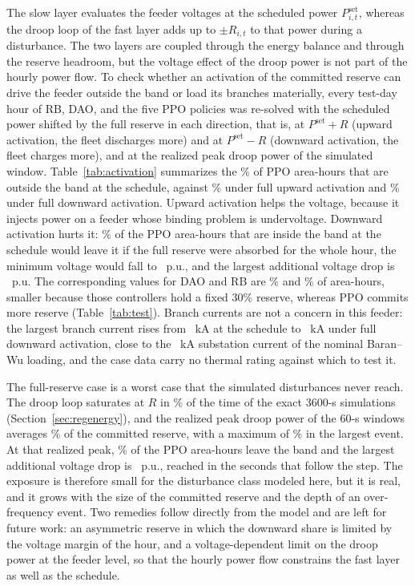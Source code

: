 The slow layer evaluates the feeder voltages at the scheduled power
$P^{\mathrm{set}}_{i,t}$, whereas the droop loop of the fast layer
adds up to $\pm R_{i,t}$ to that power during a disturbance. The two
layers are coupled through the energy balance and through the reserve
headroom, but the voltage effect of the droop power is not part of
the hourly power flow. To check whether an activation of the
committed reserve can drive the feeder outside the band or load its
branches materially, every test-day hour of RB, DAO, and the five PPO
policies was re-solved with the scheduled power shifted by the full
reserve in each direction, that is, at $P^{\mathrm{set}}+R$ (upward
activation, the fleet discharges more) and at $P^{\mathrm{set}}-R$
(downward activation, the fleet charges more), and at the realized
peak droop power of the simulated window. Table~\ref{tab:activation}
summarizes the \ActPPOViolFracSched\% of PPO area-hours that are outside the
band at the schedule, against \ActPPOViolFracUp\% under full upward
activation and \ActPPOViolFracDown\% under full downward activation.
Upward activation helps the voltage, because it injects power on a
feeder whose binding problem is undervoltage. Downward activation
hurts it: \ActPPONewViolFracDown\% of the PPO area-hours that are
inside the band at the schedule would leave it if the full reserve
were absorbed for the whole hour, the minimum voltage would fall to
\ActPPOVminDown~p.u., and the largest additional voltage drop is
\ActPPODvminDownMax~p.u. The corresponding values for DAO and RB are
\ActDAONewViolFracDown\% and \ActRBNewViolFracDown\% of area-hours,
smaller because those controllers hold a fixed 30\% reserve, whereas
PPO commits more reserve (Table~\ref{tab:test}). Branch currents are
not a concern in this feeder: the largest branch current rises from
\ActPPOImaxSchedKa~kA at the schedule to \ActPPOImaxDownKa~kA under
full downward activation, close to the \ActRefIsub~kA substation current
of the nominal Baran--Wu loading, and the case data carry no thermal
rating against which to test it.

The full-reserve case is a worst case that the simulated disturbances
never reach. The droop loop saturates at $R$ in \TrkPPOSatFrac\% of the time of the exact
3600-s simulations (Section~\ref{sec:regenergy}), and the realized
peak droop power of the 60-s windows averages \ActPPOPeakActFracMean\% of
the committed reserve, with a maximum of \ActPPOPeakActFracMax\% in the
largest event. At that realized peak, \ActPPONewViolFracDownreal\% of
the PPO area-hours leave the band and the largest additional voltage
drop is \ActPPODvminDownrealMax~p.u., reached in the seconds that
follow the step. The exposure is therefore small for the disturbance
class modeled here, but it is real, and it grows with the size of the
committed reserve and the depth of an over-frequency event. Two
remedies follow directly from the model and are left for future work:
an asymmetric reserve in which the downward share is limited by the
voltage margin of the hour, and a voltage-dependent limit on the
droop power at the feeder level, so that the hourly power flow
constrains the fast layer as well as the schedule.

